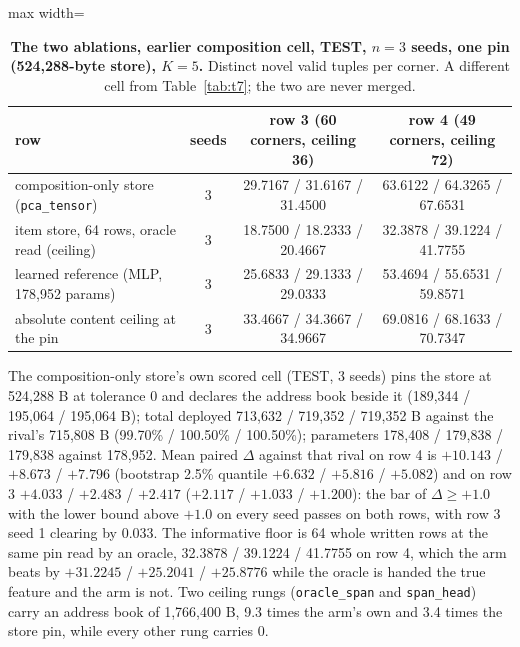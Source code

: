 \documentclass{article} %
\begin{document}
\begin{table}[h]
\centering\small
\caption{\textbf{The two ablations, earlier composition cell, TEST, $n=3$ seeds, one pin
(524,288-byte store), $K=5$.} Distinct novel valid tuples per corner. A different cell from %
Table~\ref{tab:t7}; the two are never merged.}
\label{tab:ablations}
\setlength{\tabcolsep}{3pt}
\begin{adjustbox}{max width=\linewidth}\begin{tabular}{lccc}
\toprule
row & seeds & row 3 (60 corners, ceiling 36) & row 4 (49 corners, ceiling 72) \\ %
\midrule
composition-only store (\texttt{pca\_tensor}) & 3 & 29.7167 / 31.6167 / 31.4500 & 63.6122 / 64.3265 / 67.6531 \\
item store, 64 rows, oracle read (ceiling) & 3 & 18.7500 / 18.2333 / 20.4667 & 32.3878 / 39.1224 / 41.7755 \\
learned reference (MLP, 178,952 params) & 3 & 25.6833 / 29.1333 / 29.0333 & 53.4694 / 55.6531 / 59.8571 \\
absolute content ceiling at the pin & 3 & 33.4667 / 34.3667 / 34.9667 & 69.0816 / 68.1633 / 70.7347 \\
\bottomrule
\end{tabular}\end{adjustbox}
\end{table}



The composition-only store's own scored cell (TEST, 3 seeds) pins the store at 524,288 B at
tolerance 0 and declares the address book beside it (189,344 / 195,064 / 195,064 B); total deployed
713,632 / 719,352 / 719,352 B against the rival's 715,808 B (99.70\% / 100.50\% / 100.50\%);
parameters 178,408 / 179,838 / 179,838 against 178,952. %
Mean paired $\Delta$ against that rival on row 4 is $+10.143$ / $+8.673$ / $+7.796$ (bootstrap
2.5\% quantile $+6.632$ / $+5.816$ / $+5.082$) and on row 3 $+4.033$ / $+2.483$ / $+2.417$
($+2.117$ / $+1.033$ / $+1.200$): the bar of $\Delta\ge+1.0$ with the lower bound above $+1.0$ on
every seed passes on both rows, with row 3 seed 1 clearing by 0.033.
The informative floor is 64 whole written rows at the same pin read by an oracle, 32.3878 / 39.1224
/ 41.7755 on row 4, which the arm beats by $+31.2245$ / $+25.2041$ / $+25.8776$ while the oracle is
handed the true feature and the arm is not. %
Two ceiling rungs (\texttt{oracle\_span} and \texttt{span\_head}) carry an address book of 1,766,400
B, 9.3 times the arm's own and 3.4 times the store pin, while every other rung carries 0.
\end{document}
